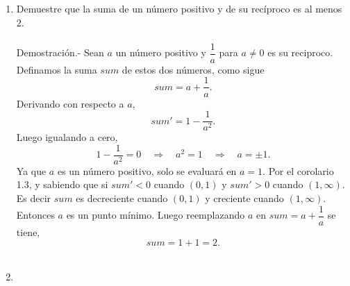 \begin{enumerate}[\bfseries 1.]
    \item Demuestre que la suma de un número positivo y de su recíproco es al menos $2$.\\\\
	Demostración.-\; Sean $a$ un número positivo y $\dfrac{1}{a}$ para $a\neq 0$ es su reciproco. Definamos la suma $sum$ de estos dos números, como sigue
	$$sum=a+\dfrac{1}{a}.$$
	Derivando con respecto a $a$,
	$$sum'=1-\dfrac{1}{a^2}.$$
	Luego igualando a cero,
	$$1-\dfrac{1}{a^2}=0\quad \Rightarrow \quad a^2=1 \quad \Rightarrow \quad a=\pm 1.$$
	Ya que $a$ es un número positivo, solo se evaluará en $a=1$. Por el corolario 1.3, y sabiendo que si $sum'<0$ cuando $(0,1)$ y $sum'>0$ cuando $(1,\infty)$. Es decir $sum$ es decreciente cuando $(0,1)$ y creciente cuando $(1,\infty)$. Entonces $a$ es un punto mínimo. Luego reemplazando $a$ en $sum=a+\dfrac{1}{a}$ se tiene,
	$$sum=1+1=2.$$\\

    \item 



\end{enumerate}
